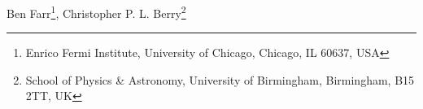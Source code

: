 Ben Farr\footnote{Enrico Fermi Institute, University of Chicago, Chicago, IL 60637, USA}, Christopher P. L. Berry\footnote{School of Physics & Astronomy, University of Birmingham, Birmingham, B15 2TT, UK}